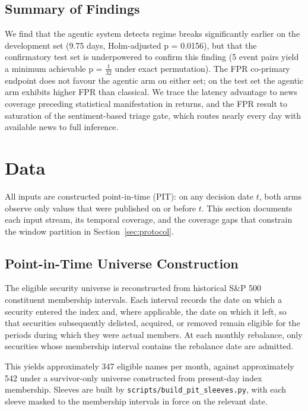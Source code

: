 \documentclass[11pt,a4paper]{article}
\begin{document}
\subsection{Summary of Findings}\label{sec:summary}

We find that the agentic system detects regime breaks significantly earlier on the development set (9.75 days, Holm-adjusted p = 0.0156), but that the confirmatory test set is underpowered to confirm this finding (5 event pairs yield a minimum achievable p = $\frac{1}{32}$ under exact permutation). The FPR co-primary endpoint does not favour the agentic arm on either set; on the test set the agentic arm exhibits higher FPR than classical. We trace the latency advantage to news coverage preceding statistical manifestation in returns, and the FPR result to saturation of the sentiment-based triage gate, which routes nearly every day with available news to full inference.

\section{Data}\label{sec:data}

All inputs are constructed point-in-time (PIT): on any decision date $t$, both
arms observe only values that were published on or before $t$. This section
documents each input stream, its temporal coverage, and the coverage gaps that
constrain the window partition in Section~\ref{sec:protocol}.

\subsection{Point-in-Time Universe Construction}\label{sec:data-universe}

The eligible security universe is reconstructed from historical S\&P 500
constituent membership intervals. Each interval records the date on which a
security entered the index and, where applicable, the date on which it left,
so that securities subsequently delisted, acquired, or removed remain eligible
for the periods during which they were actual members. At each monthly
rebalance, only securities whose membership interval contains the rebalance
date are admitted.

This yields approximately 347 eligible names per month, against approximately
542 under a survivor-only universe constructed from present-day index
membership. Sleeves are built by \texttt{scripts/build\_pit\_sleeves.py}, with
each sleeve masked to the membership intervals in force on the relevant date.
\end{document}
